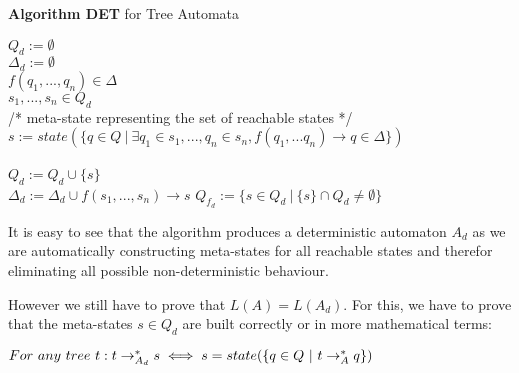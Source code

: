 \documentclass{llncs}
\begin{document}
\begin{definition}{\textbf{Algorithm DET} for Tree Automata \cite{tata-nfta}}
\\
\begin{algorithm}[H]
	\(Q_d := \emptyset\)\\
	\(\Delta_d := \emptyset\)
	\\
		 {
			\( f(q_1,...,q_n) \in \Delta\)\\
			\(s_1,...,s_n \in Q_d\)\\
			/* meta-state representing the set of reachable states */ \\
			\( s := state(\{ q \in Q ~|~ \exists q_1 \in s_1,..., q_n \in s_n, f(q_1,...q_n) \rightarrow q \in \Delta \}) \)\\~\\
			\(Q_d := Q_d \cup \{s\}\)\\
			\(\Delta_d := \Delta_d \cup f(s_1,...,s_n) \rightarrow s \)
		}
	\(Q_{f_d} := \{ s \in Q_d ~ | ~ \{s\} \cap Q_d \neq \emptyset \}\)\\
\end{algorithm}
\end{definition}

It is easy to see that the algorithm produces a deterministic automaton \(A_d\) as we are automatically constructing meta-states for all reachable states and therefor eliminating all possible non-deterministic behaviour.

\pagebreak

However we still have to prove that \(L(A) = L(A_d)\).\newline 
For this, we have to prove that the meta-states \(s \in Q_d\) are built correctly or in more mathematical terms:

\begin{center}
	\(For~any~tree~t: t \rightarrow_{A_d}^* s \iff s = state(\{q \in Q ~|~ t \rightarrow_A^* q\})\)
\end{center}
\end{document}
